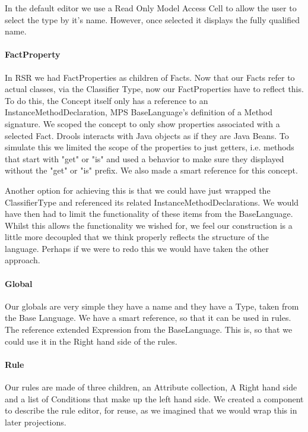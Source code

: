 In the default editor we use a Read Only Model Access Cell to allow the user to select the type by it's name.
However, once selected it displays the fully qualified name.

\paragraph{FactProperty} In RSR we had FactProperties as children of Facts.
Now that our Facts refer to actual classes, via the Classifier Type, now our FactProperties have to reflect this.
To do this, the Concept itself only has a reference to an InstanceMethodDeclaration, MPS BaseLanguage's definition of a Method signature.
We scoped the concept to only show properties associated with a selected Fact.
Drools interacts with Java objects as if they are Java Beans.
To simulate this we limited the scope of the properties to just getters, i.e. methods that start with "get" or "is" and used a behavior to make sure they displayed without the "get" or "is" prefix.
We also made a smart reference for this concept.

Another option for achieving this is that we could have just wrapped the ClassifierType and referenced its related InstanceMethodDeclarations.
We would have then had to limit the functionality of these items from the BaseLanguage.
Whilst this allows the functionality we wished for, we feel our construction is a little more decoupled that we think properly reflects the structure of the language.
Perhaps if we were to redo this we would have taken the other approach.

\paragraph{Global} Our globals are very simple they have a name and they have a Type, taken from the Base Language.
We have a smart reference, so that it can be used in rules.
The reference extended Expression from the BaseLanguage.
This is, so that we could use it in the Right hand side of the rules.

\paragraph{Rule} Our rules are made of three children, an Attribute collection, A Right hand side and a list of Conditions that make up the left hand side.
We created a component to describe the rule editor, for reuse, as we imagined that we would wrap this in later projections.


